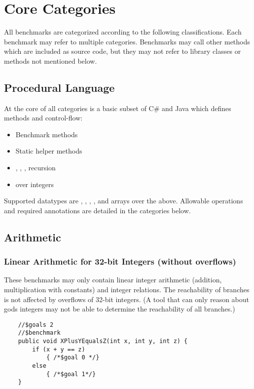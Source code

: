 \section{Core Categories}

All benchmarks are categorized according to the following classifications.
Each benchmark may refer to multiple categories.
Benchmarks may call other methods which are included as source code,
but they may not refer to library classes or methods not mentioned below.

\subsection{Procedural Language}

At the core of all categories is a basic subset of C\# and Java
which defines methods and control-flow:
\begin{itemize}
\item Benchmark methods
\item Static helper methods
\item {}, , , recursion
\item {} over integers
\end{itemize}

Supported datatypes are , , ,
, and arrays over the above.
Allowable operations and required annotations are detailed in the categories below.

\subsection{Arithmetic}

\subsubsection{Linear Arithmetic for 32-bit Integers (without overflows)}

These benchmarks may only contain linear integer arithmetic (addition, multiplication with constants)
and integer relations. The reachability of branches is not affected by overflows of 32-bit integers. 
(A tool that can only reason about gods integers may not be able to determine the 
reachability of all branches.)
\begin{verbatim}
    //$goals 2
    //$benchmark
    public void XPlusYEqualsZ(int x, int y, int z) {
        if (x + y == z)
            { /*$goal 0 */}
        else
            { /*$goal 1*/}
    }
\end{verbatim}

